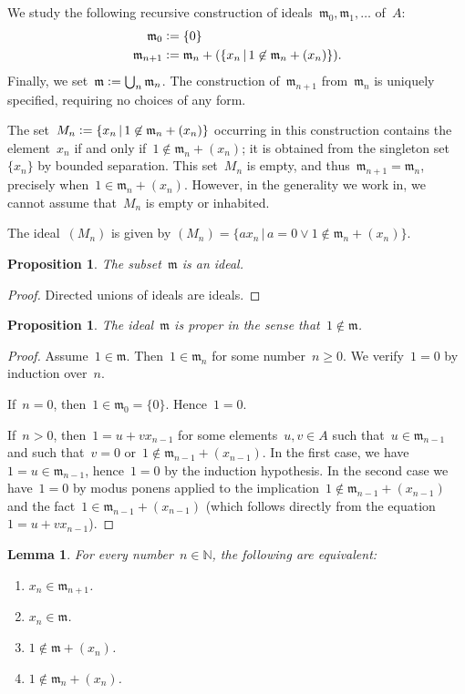 \documentclass[oneside,reqno]{amsart}
\theoremstyle{definition}
\theoremstyle{plain}
\newtheorem{prop}[defn]{Proposition}
\newtheorem{lemma}[defn]{Lemma}
\theoremstyle{remark}
\newcommand{\mmm}{\mathfrak{m}}
\newcommand{\NN}{\mathbb{N}}
\newcommand{\defeq}{\vcentcolon=}
\renewcommand{\_}{\mathpunct{.}\,}
\begin{document}
We study the following recursive construction of ideals~$\mmm_0, \mmm_1,
\ldots$ of~$A$:
\begin{align*}
  \mmm_0 &\defeq \{0\} \\
  \mmm_{n+1} &\defeq \mmm_n + (\{ x_n \,|\, 1 \not\in \mmm_n + (x_n) \}).
\end{align*}
Finally, we set~$\mmm \defeq \bigcup_n \mmm_n$. The construction
of~$\mmm_{n+1}$ from~$\mmm_n$ is uniquely specified, requiring no choices of
any form.

The set~$M_n \defeq \{ x_n \,|\, 1 \not\in \mmm_n + (x_n) \}$ occurring in this
construction contains the element~$x_n$ if and only if~$1 \not\in \mmm_n +
(x_n)$; it is obtained from the singleton set~$\{x_n\}$ by bounded separation.
This set~$M_n$ is empty, and thus~$\mmm_{n+1} = \mmm_n$, precisely when~$1 \in \mmm_n + (x_n)$.
However, in the generality we work in, we cannot assume that~$M_n$ is empty or
inhabited.

The ideal~$(M_n)$ is given by
$(M_n) = \{ a x_n \,|\, a = 0 \vee 1 \not\in \mmm_n + (x_n) \}$.

\begin{prop}The subset~$\mmm$ is an ideal.
\end{prop}

\begin{proof}Directed unions of ideals are ideals.\end{proof}

\begin{prop}\label{prop:proper}
The ideal~$\mmm$ is \emph{proper} in the sense that~$1 \not\in \mmm$.\end{prop}

\begin{proof}Assume~$1 \in \mmm$. Then~$1 \in \mmm_n$ for some number~$n \geq 0$. We
verify~$1 = 0$ by induction over~$n$.

If~$n = 0$, then~$1 \in \mmm_0 = \{0\}$. Hence~$1 = 0$.

If~$n > 0$, then~$1 = u + v x_{n-1}$ for some elements~$u,v \in A$ such that~$u
\in \mmm_{n-1}$ and such that~$v = 0$ or~$1 \not\in \mmm_{n-1} + (x_{n-1})$.
In the first case, we have~$1 = u \in \mmm_{n-1}$, hence~$1 = 0$ by the induction
hypothesis. In the second case we have~$1 = 0$ by modus ponens applied to the
implication~$1 \not\in \mmm_{n-1} + (x_{n-1})$ and the fact~$1 \in \mmm_{n-1} +
(x_{n-1})$ (which follows directly from the equation~$1 = u + v x_{n-1}$).
\end{proof}

\begin{lemma}\label{lemma:stage}
For every number~$n \in \NN$, the following are equivalent:
\begin{enumerate}
\item $x_n \in \mmm_{n+1}$.
\item $x_n \in \mmm$.
\item $1 \not\in \mmm + (x_n)$.
\item $1 \not\in \mmm_n + (x_n)$.
\end{enumerate}
\end{lemma}
\end{document}
